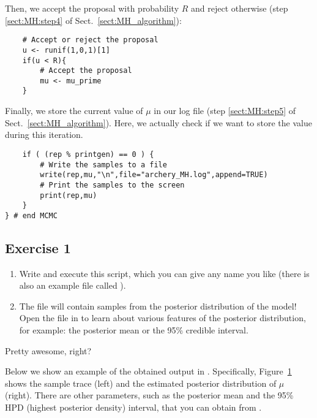 Then, we accept the proposal with probability $R$ and reject otherwise (step \ref{sect:MH:step4} of Sect.\ \ref{sect:MH_algorithm}):
{\tt \begin{snugshade*}
\begin{lstlisting}    
    # Accept or reject the proposal
    u <- runif(1,0,1)[1]
    if(u < R){
        # Accept the proposal
        mu <- mu_prime
    }
\end{lstlisting}
\end{snugshade*}}

Finally, we store the current value of $\mu$ in our log file (step \ref{sect:MH:step5} of Sect.\ \ref{sect:MH_algorithm}).
Here, we actually check if we want to store the value during this iteration.
{\tt \begin{snugshade*}
\begin{lstlisting}
    if ( (rep % printgen) == 0 ) {
        # Write the samples to a file
        write(rep,mu,"\n",file="archery_MH.log",append=TRUE)
        # Print the samples to the screen
        print(rep,mu)
    }
} # end MCMC\end{lstlisting}
\end{snugshade*}}


\subsection{Exercise 1}

\begin{enumerate}[label=\textnormal{Step \arabic*)}]
	\item Write and execute this script, which you can give any name you like (there is also an example file called ).
	\item The  file will contain samples from the posterior distribution of the model! Open the file in \Tracer to learn about various features of the posterior distribution, for example: the posterior mean or the 95\% credible interval.
\end{enumerate}
Pretty awesome, right?

Below we show an example of the obtained output in \Tracer.
Specifically, Figure~\ref{fig:mcmc_samples} shows the sample trace (left) and the estimated posterior distribution of $\mu$ (right).
There are other parameters, such as the posterior mean and the 95\% HPD (highest posterior density) interval, that you can obtain from \Tracer.
\begin{figure}[h!]
\centering
{}
\label{fig:mcmc_samples}
\end{figure}
\pagebreak


